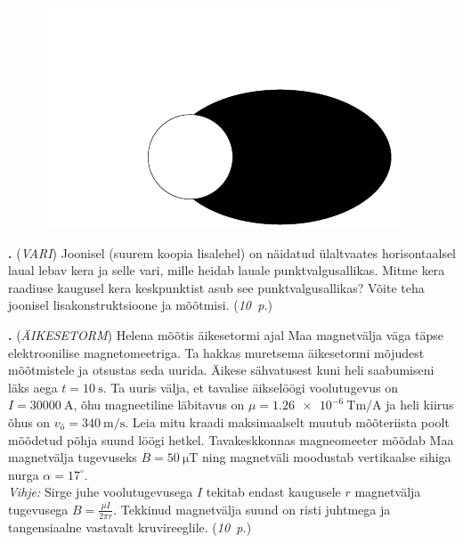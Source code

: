 \documentclass[11pt,a5paper]{article}
\newcommand{\numb}[1]{\vspace{5pt}\textbf{\large #1}}
\newcommand{\nimi}[1]{(\textsl{\small #1})}
\newcommand{\punktid}[1]{(\emph{#1~p.})}
\newcounter{ylesanne}
\newcommand{\yl}[1]{\addtocounter{ylesanne}{1}\numb{\theylesanne.} \nimi{#1} \newblock{}}
\newcommand{\autor}[1]{}%
\begin{document}
\begin{figure}
\vspace{-0.8cm}
  \begin{center}
    \includegraphics[width=1\linewidth]{vari.pdf}
  \end{center}
  \vspace{-0.9cm}
\end{figure}

\yl{VARI}
Joonisel (suurem koopia lisalehel) on näidatud ülaltvaates horisontaalsel laual lebav kera ja selle vari, mille heidab lauale punktvalgusallikas. Mitme kera raadiuse kaugusel kera keskpunktist asub see punktvalgusallikas? Võite teha joonisel lisakonstruktsioone ja mõõtmisi.
\punktid{10} \autor{Jaan Kalda}



\yl{ÄIKESETORM}
Helena mõõtis äikesetormi ajal Maa magnetvälja väga täpse elektroonilise magnetomeetriga. Ta hakkas muretsema äikesetormi mõjudest mõõtmistele ja otsustas seda uurida. Äikese sähvatusest kuni heli saabumiseni läks aega $t = \SI{10}{\s}$. Ta uuris välja, et tavalise äikselöögi voolutugevus on $I = \SI{30000}{\ampere}$, õhu magneetiline läbitavus on $\mu = \SI{1.26e-6}{\tesla\metre\per\ampere}$ ja heli kiirus õhus on $v_{õ} = \SI{340}{\m\per\s}$. Leia mitu kraadi maksimaalselt muutub mõõteriista poolt mõõdetud põhja suund löögi hetkel. Tavakeskkonnas magneomeeter mõõdab Maa magnetvälja tugevuseks $B = \SI{50}{\micro \tesla}$ ning magnetväli moodustab vertikaalse sihiga nurga $\alpha = 17^{\circ}$. \\
\textit{Vihje:} Sirge juhe voolutugevusega $I$ tekitab endast kaugusele $r$ magnetvälja tugevusega $B = \frac{\mu I}{2\pi r}$. Tekkinud magnetvälja suund on risti juhtmega ja tangensiaalne vastavalt kruvireeglile.
\punktid{10} \autor{Jarl Patrick Paide}
\end{document}
